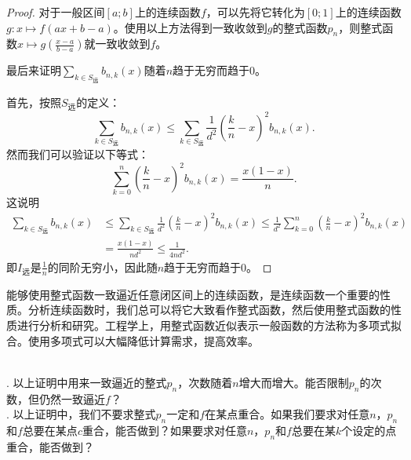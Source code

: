 \documentclass[12pt,UTF8,fontset=none]{ctexbook}
\begin{document}
\begin{appendix}
\begin{proof}
    对于一般区间$[a;b]$上的连续函数$f$，可以先将它转化为$[0;1]$上的连续函数$g: x\mapsto f(ax + b - a)$。使用以上方法得到一致收敛到$g$的整式函数$p_n$，则整式函数$x\mapsto g\left(\frac{x - a}{b - a}\right) $就一致收敛到$f$。

    最后来证明$ \sum_{k\in S_{\text{远}}} b_{n,k}(x) $随着$n$趋于无穷而趋于$0$。

    首先，按照$S_{\text{远}}$的定义：
    $$ \sum_{k\in S_{\text{远}}} b_{n,k}(x) \leqslant \sum_{k\in S_{\text{远}}}  \frac{1}{d^2}\left(\frac{k}{n} - x\right)^2 b_{n,k}(x). $$
    然而我们可以验证以下等式：
    $$ \sum_{k=0}^n \left(\frac{k}{n} - x\right)^2 b_{n,k}(x) = \frac{x(1 - x)}{n}. $$
    这说明
    \begin{align*}
        \sum_{k\in S_{\text{远}}} b_{n,k}(x) &\leqslant \sum_{k\in S_{\text{远}}}  \frac{1}{d^2}\left(\frac{k}{n} - x\right)^2 b_{n,k}(x) \leqslant \frac{1}{d^2} \sum_{k=0}^n \left(\frac{k}{n} - x\right)^2 b_{n,k}(x) \\
        &= \frac{x(1 - x)}{nd^2} \leqslant \frac{1}{4nd^2}.
    \end{align*}
    即$I_{\text{远}}$是$\frac{1}{n}$的同阶无穷小，因此随$n$趋于无穷而趋于$0$。
    
\end{proof}

能够使用整式函数一致逼近任意闭区间上的连续函数，是连续函数一个重要的性质。分析连续函数时，我们总可以将它大致看作整式函数，然后使用整式函数的性质进行分析和研究。工程学上，用整式函数近似表示一般函数的方法称为多项式拟合。使用多项式可以大幅降低计算需求，提高效率。

\begin{sk}
    \mbox{} \\
    . 以上证明中用来一致逼近的整式$p_n$，次数随着$n$增大而增大。能否限制$p_n$的次数，但仍然一致逼近$f$？\\
    . 以上证明中，我们不要求整式$p_n$一定和$f$在某点重合。如果我们要求对任意$n$，$p_n$和$f$总要在某点$c$重合，能否做到？如果要求对任意$n$，$p_n$和$f$总要在某$k$个设定的点重合，能否做到？
\end{sk}


\end{appendix}
\end{document}
